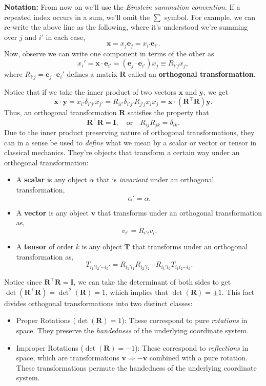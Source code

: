 \documentclass[
  letterpaper,
  DIV=11,
  numbers=noendperiod]{scrreprt}
\providecommand{\tightlist}{%
  \setlength{\itemsep}{0pt}\setlength{\parskip}{0pt}}\usepackage{longtable,booktabs,array}
\begin{document}
\textbf{Notation:} From now on we'll use the \emph{Einstein summation
convention}. If a repeated index occurs in a sum, we'll omit the
\(\sum\) symbol. For example, we can re-write the above line as the
following, where it's understood we're summing over \(j\) and \(i'\) in
each case, \[
\mathbf{x} = x_j \mathbf{e}_j = x_{i'} \mathbf{e}_{i'}.
\] Now, observe we can write one component in terms of the other as \[
x_i' = \mathbf{x} \cdot \mathbf{e}_{i'} = (\mathbf{e}_j \cdot \mathbf{e}_{i'}) x_j \equiv R_{i'j} x_j,
\] where \(R_{i'j} = \mathbf{e}_j \cdot \mathbf{e}_i'\) defines a matrix
\(\mathbf{R}\) called an \textbf{orthogonal transformation}.

Notice that if we take the inner product of two vectors \(\mathbf{x}\)
and \(\mathbf{y}\), we get \[
\mathbf{x} \cdot \mathbf{y} = x_{i'} \delta_{i' j'} x_{j'} = R_{ii'} \delta_{i'j'} R_{j'j} x_i x_j = \mathbf{x} \cdot (\mathbf{R}^\top \mathbf{R}) \mathbf{y}.
\] Thus, an orthogonal transformation \(\mathbf{R}\) satisfies the
property that \[
\mathbf{R}^\top \mathbf{R} = \mathbf{I}, \quad \text{or} \quad R_{ij} R_{jk} = \delta_{ik}.
\] Due to the inner product preserving nature of orthogonal
transformations, they can in a sense be used to \emph{define} what we
mean by a scalar or vector or tensor in classical mechanics. They're
objects that transform a certain way under an orthogonal transformation:

\begin{itemize}
\item
  A \textbf{scalar} is any object \(\alpha\) that is \emph{invariant}
  under an orthogonal transformation, \[
  \alpha' = \alpha.
  \]
\item
  A \textbf{vector} is any object \(\mathbf{v}\) that transforms under
  an orthogonal transformation as, \[
  v_{i'} = R_{i'i} v_i.
  \]
\item
  A \textbf{tensor} of order \(k\) is any object \(\mathbf{T}\) that
  transforms under an orthogonal transformation as, \[
  T_{i_1' i_2' \cdots i_k'} = R_{i_1' i_1} R_{i_2' i_2} \cdots R_{i_k' i_k} T_{i_1 i_2 \cdots i_k}.
  \]
\end{itemize}

Notice since \(\mathbf{R}^\top \mathbf{R} = \mathbf{I}\), we can take
the determinant of both sides to get
\(\det(\mathbf{R}^\top \mathbf{R}) = \det^2(\mathbf{R}) = 1\), which
implies that \(\det(\mathbf{R}) = \pm 1\). This fact divides orthogonal
transformations into two distinct classes:

\begin{itemize}
\tightlist
\item
  Proper Rotations (\(\det(\mathbf{R}) = 1\)): These correspond to pure
  \emph{rotations} in space. They preserve the \emph{handedness} of the
  underlying coordinate system.
\item
  Improper Rotations (\(\det(\mathbf{R}) = -1\)): These correspond to
  \emph{reflections} in space, which are transformations
  \(\mathbf{v} \Rightarrow -\mathbf{v}\) combined with a pure rotation.
  These transformations permute the handedness of the underlying
  coordinate system.
\end{itemize}
\end{document}
